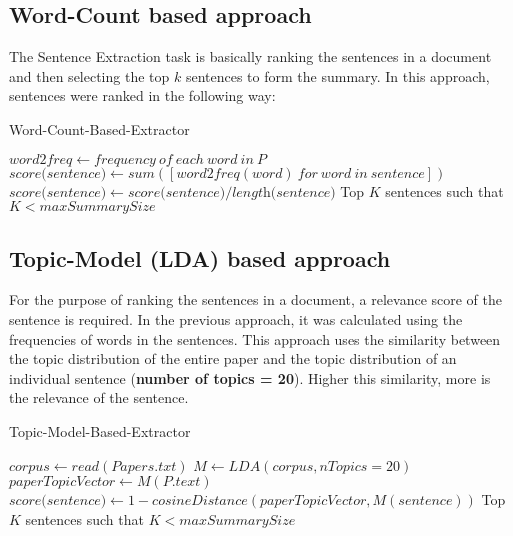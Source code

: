 \subsection{Word-Count based approach}
The Sentence Extraction task is basically ranking the sentences in a document and then selecting the top $k$ sentences to form the summary. In this approach, sentences were ranked in the following way:  
\begin{algorithm}
\caption{Word-Count-Based-Extractor}\label{euclid}
\begin{algorithmic}[1]
        \State $\textit{word2freq} \gets frequency \: of \: each \: word \: in \: \textit{P} $ 
        \State $\textit{score(sentence)} \gets sum([\textit{word2freq}(word) \: for \: word \: in \: sentence])$
        \State $\textit{score(sentence)} \gets \textit{score(sentence)}/\textit{length(sentence)} $
        \State \Return Top $K$ sentences such that $K < maxSummarySize$ 
\EndFor
\EndProcedure
\end{algorithmic}
\end{algorithm}
\subsection{Topic-Model (LDA) based approach}
For the purpose of ranking the sentences in a document, a relevance score of the sentence is required. In the previous approach, it was calculated using the frequencies of words in the sentences. This approach uses the similarity between the topic distribution of the entire paper and the topic distribution of an individual sentence (\textbf{number of topics = 20}). Higher this similarity, more is the relevance of the sentence.
\begin{algorithm}
\caption{Topic-Model-Based-Extractor}\label{euclid}
\begin{algorithmic}[1]
\State $corpus \gets read(Papers.txt)$
\State $\textit{M} \gets LDA(corpus, nTopics=20)$
        \State $\textit{paperTopicVector} \gets M(P.text)$
        \State $\textit{score(sentence)} \gets 1 - cosineDistance(paperTopicVector, M(sentence))$
        \State \Return Top $K$ sentences such that $K < maxSummarySize$ 
\EndFor
\EndProcedure
\end{algorithmic}
\end{algorithm}
\newpage
